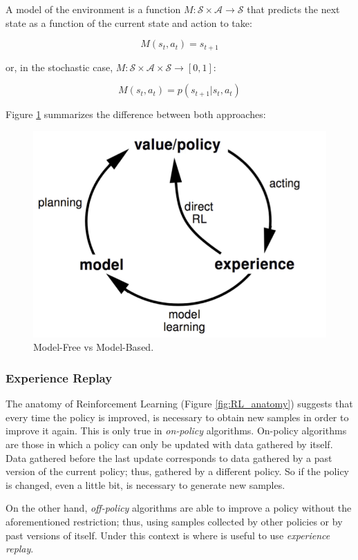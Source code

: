A model of the environment is a function $M: \mathcal{S} \times \mathcal{A} \to \mathcal{S}$ that predicts the next state as a function of the current state and action to take:

\begin{equation}
    M(s_{t},a_{t}) = s_{t+1}  
\end{equation}

or, in the stochastic case, $M: \mathcal{S} \times \mathcal{A} \times \mathcal{S} \to [0, 1]$:

\begin{equation}
    M(s_{t},a_{t}) = p(s_{t+1}|s_{t},a_{t})  
\end{equation}

Figure \ref{fig:free_based_model} summarizes the difference between both approaches:

\begin{figure}[h]
    \centering
    \includegraphics[width=0.6\linewidth]{imagenes/cap1/free_based_model.png}
    \caption{Model-Free vs Model-Based.}
    \label{fig:free_based_model}
\end{figure}

\subsubsection{Experience Replay}
The anatomy of Reinforcement Learning (Figure \ref{fig:RL_anatomy}) suggests that every time the policy is improved, is necessary to obtain new samples in order to improve it again. This is only true in \emph{on-policy} algorithms. On-policy algorithms are those in which a policy can only be updated with data gathered by itself. Data gathered before the last update corresponds to data gathered by a past version of the current policy; thus, gathered by a different policy. So if the policy is changed, even a little bit, is necessary to generate new samples. 

On the other hand, \emph{off-policy} algorithms are able to improve a policy without the aforementioned restriction; thus, using samples collected by other policies or by past versions of itself. Under this context is where is useful to use \emph{experience replay}.

